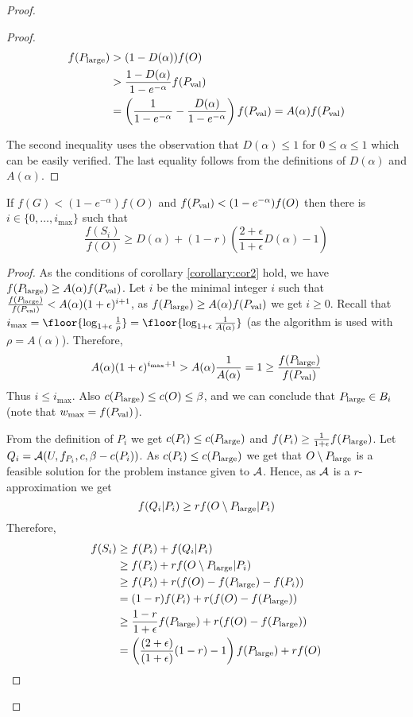 \begin{proof}
\begin{proof}
		\begin{align*}
			f(P_{\text{large}}) 	& > (1-D(\alpha)) f(O) \\
						& > \frac{1-D(\alpha)}{1-e^{-\alpha}} f(P_{\text{val}}) \\
						& = \left(\frac{1}{1-e^{-\alpha}} - \frac{D(\alpha)}{1-e^{-\alpha}}\right) f(P_{\text{val}}) =  A(\alpha) f(P_{\text{val}})
		\end{align*}

		The second inequality uses the observation that $D(\alpha) \leq 1$ for $0\leq \alpha \leq 1$ which can be easily verified. The last equality follows from the definitions
		of $D(\alpha)$ and $A(\alpha)$.
		
			
		\end{proof}

	\begin{corollary}
		\label{corollary:cor3}
			If $f(G)< (1-e^{-\alpha})f(O)$ and $f(P_{\text{val}}) < (1-e^{-\alpha})f(O)$ then
			there is $i\in \{0, \ldots, i_{\max}\}$ such that
		$$\frac{f(S_i)}{f(O)} \geq D(\alpha) + (1-r)\left( \frac{2+\epsilon}{1+\epsilon} D(\alpha) -1 \right)$$
	\end{corollary}
\begin{proof}
		As the conditions of corollary \ref{corollary:cor2} hold, we have
		$f(P_{\text{large}}) \geq A(\alpha) f(P_{\text{val}})$.
		 Let $i$ be the minimal integer $i$ such
		that $\frac{f(P_{\text{large}})}{f(P_{\text{val}})} < A(\alpha)(1+\epsilon) ^{i+1}$, as $f(P_{\text{large}}) \geq A(\alpha) f(P_{\text{val}})$ we get $i\geq 0$.
		Recall that $i_{\max}= \floor{\log_{1+\epsilon} \frac{1}{\rho} } =
		\floor{\log_{1+\epsilon} \frac{1}{A(\alpha)}} $ (as the algorithm is used
			with $\rho=A(\alpha)$).
			Therefore,
			$$A(\alpha) (1+\epsilon) ^{i_{\max} +1}
			> A(\alpha) \frac{1}{A(\alpha) } = 1 \geq \frac{f(P_{\text{large}})}{f(P_{\text{val}})}$$
			Thus $i\leq i_{\max}$.
			Also $c(P_{\text{large}}) \leq c(O) \leq \beta$, and we can conclude that
			$P_{\text{large}} \in B_i$ (note that $w_{\max} = f(P_{\text{val}})$).
			
			From the definition of $P_i$ we get $c(P_i)\leq c(P_{\text{large}})$ and
			$f(P_i) \geq \frac{1}{1+\epsilon} f(P_{\text{large}})$.
			Let $Q_i  =  \mathcal{A}(U, f_{P_i}, c, \beta - c(P_i))$.
			As $c(P_i) \leq c(P_{\text{large}})$ we get that $O\setminus P_{\text{large}}$
			is a feasible solution for the problem instance given to $\mathcal{A}$.
			Hence, as $\mathcal{A}$ is a $r$-approximation we get
			$$f(Q_i | P_i) \geq r f(O\setminus P_{\text{large}}| P_i)$$
			Therefore,
			\begin{align*}
			f(S_{i})
			&
			\geq f(P_i) + f(Q_i|P_i)
			\\ &
			\geq f(P_i) + r f(O \setminus P_{\text{large}} | P_i)
			\\ &
			\geq f(P_i) + r(f(O) - f(P_{\text{large}}) - f(P_i))
			\\ &
			= (1-r)f(P_i) + r(f(O) - f(P_{\text{large}}))
			\\ &
			\geq \frac{1-r}{1 + \epsilon}f(P_{\text{large}}) + r(f(O) - f(P_{\text{large}}))
			\\ &
			= \left(
			\frac{(2 + \epsilon)}{(1 + \epsilon)}(1-r) - 1
			\right)
			f(P_{\text{large}})
			+ rf(O)
			\label{eq:sub:bucket}
			\end{align*}
			

\end{proof}
\end{proof}
